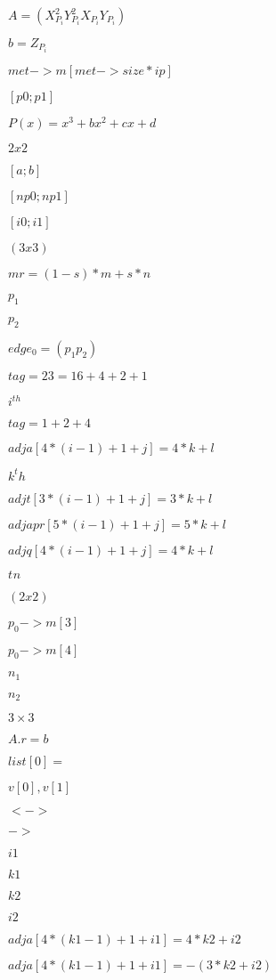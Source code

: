 \documentclass{article}
\begin{document}
$ A=( X_{P_i}^2 Y_{P_i}^2 X_{P_i}Y_{P_i}) $
\pagebreak

$ b= Z_{P_i}$
\pagebreak

$ met->m[met->size * ip] $
\pagebreak

$[p0;p1]$
\pagebreak

$P(x) = x^3+bx^2+cx+d$
\pagebreak

$2x2$
\pagebreak

$[a;b]$
\pagebreak

$[np0;np1]$
\pagebreak

$[i0;i1]$
\pagebreak

$(3 x 3)$
\pagebreak

$ mr = (1-s)*m +s*n $
\pagebreak

$p_1$
\pagebreak

$p_2$
\pagebreak

$edge_0 = (p_1p_2)$
\pagebreak

$tag=23=16+4+2+1$
\pagebreak

$i^{th}$
\pagebreak

$tag = 1+2+4$
\pagebreak

$adja[4*(i-1)+1+j]=4*k+l$
\pagebreak

$k^th$
\pagebreak

$adjt[3*(i-1)+1+j]=3*k+l$
\pagebreak

$adjapr[5*(i-1)+1+j]=5*k+l$
\pagebreak

$adjq[4*(i-1)+1+j]=4*k+l$
\pagebreak

$t^{}n$
\pagebreak

$(2x2)$
\pagebreak

$ p_0->m[3]$
\pagebreak

$ p_0->m[4]$
\pagebreak

$n_1$
\pagebreak

$n_2$
\pagebreak

$ 3\times 3$
\pagebreak

$ A . r = b $
\pagebreak

$list[0] =$
\pagebreak

$v[0],v[1]$
\pagebreak

$ <-> $
\pagebreak

$ -> $
\pagebreak

$ i1 $
\pagebreak

$ k1 $
\pagebreak

$ k2 $
\pagebreak

$ i2 $
\pagebreak

$ adja[4*(k1-1)+1+i1] = 4*k2+i2 $
\pagebreak

$ adja[4*(k1-1)+1+i1] = -(3*k2+i2) $
\pagebreak
\end{document}
